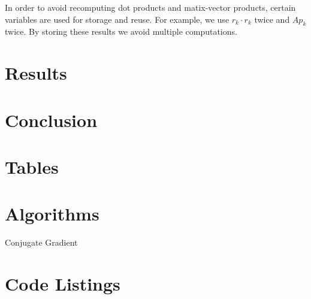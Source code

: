 In order to avoid recomputing dot products and matix-vector products, certain variables are used for storage and reuse.
For example, we use $r_k \cdot r_k$ twice and $A p_k$ twice. By storing these results we avoid multiple computations.


\section{Results}

\iffalse
Results:
Graphs, errors, convergence rates,
\fi


\section{Conclusion}



\clearpage
\appendix
\section{Tables}


\section{Algorithms}


\begin{algorithm}[H]



\caption{Conjugate Gradient}
\label{alg:cg}
\end{algorithm}


\section{Code Listings}
